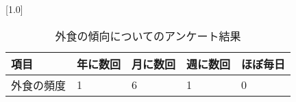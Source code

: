 \begin{table}[H]
\centering
\caption{外食の傾向についてのアンケート結果}
\label{table:questionnaire:frequency}
\small
\scalebox{0.7}[1.0]{
\begin{tabular}{|l|l|l|l|l|}
\hline
項目 & 年に数回 & 月に数回 & 週に数回 & ほぼ毎日 \\ \hline
外食の頻度 & 1 & 6 & 1 & 0 \\ \hline
\end{tabular}
}
\end{table}
